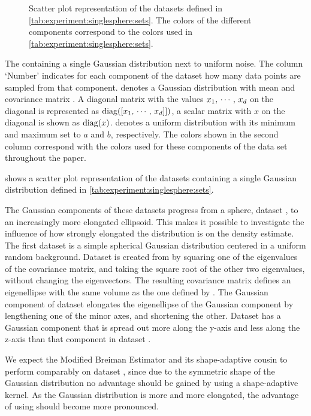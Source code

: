 
\begin{figure*}
	\centering
	
	\caption{Scatter plot representation of the datasets defined in \cref{tab:experiment:singlesphere:sets}. The colors of the different components correspond to the colors used in \cref{tab:experiment:singlesphere:sets}.}
	\label{fig:experiment:singlesphere:sets}
\end{figure*}

\begin{table*}
	\centering
	
	\caption{The containing a single Gaussian distribution next to uniform noise. The column `Number' indicates for each component of the dataset how many data points are sampled from that component. \gaussDist{\varMean}{\varCovarianceMatrix} denotes a Gaussian distribution with mean \varMean and covariance matrix \varCovarianceMatrix. A diagonal matrix with the values $x_1,\, \cdots,\, x_d$ on the diagonal is represented as $\operatorname{diag}([x_1,\,\cdots,\,x_d]])$, a scalar matrix with $x$ on the diagonal is shown as $\operatorname{diag}(x)$.  denotes a uniform distribution with its minimum and maximum set to $a$ and $b$, respectively. The colors shown in the second column correspond with the colors used for these components of the data set throughout the paper.} 	
	\label{tab:experiment:singlesphere:sets}
\end{table*}

 shows a scatter plot representation of the datasets containing a single Gaussian distribution defined in \cref{tab:experiment:singlesphere:sets}. 

The Gaussian components of these datasets progress from a sphere, \ie dataset \ferdosiOne, to an increasingly more elongated ellipsoid. This makes it possible to investigate the influence of how strongly elongated the distribution is on the density estimate. 
	The first dataset is a simple spherical Gaussian distribution centered in a uniform random background. 
	Dataset \baakmanOne is created from \ferdosiOne by squaring one of the eigenvalues of the covariance matrix, and taking the square root of the other two eigenvalues, without changing the eigenvectors. The resulting covariance matrix defines an eigenellipse with the same volume as the one defined by \ferdosiOne.
	The Gaussian component of dataset \baakmanFour elongates the eigenellipse of the Gaussian component by lengthening one of the minor axes, and shortening the other.
	Dataset \baakmanFive has a Gaussian component that is spread out more along the y-axis and less along the z-axis than that component in dataset \baakmanFour. 

	We expect the Modified Breiman Estimator and its shape-adaptive cousin to perform comparably on dataset \ferdosiOne, since due to the symmetric shape of the Gaussian distribution no advantage should be gained by using a shape-adaptive kernel. 
	As the Gaussian distribution is more and more elongated, the advantage of using \sambe should become more pronounced. 
